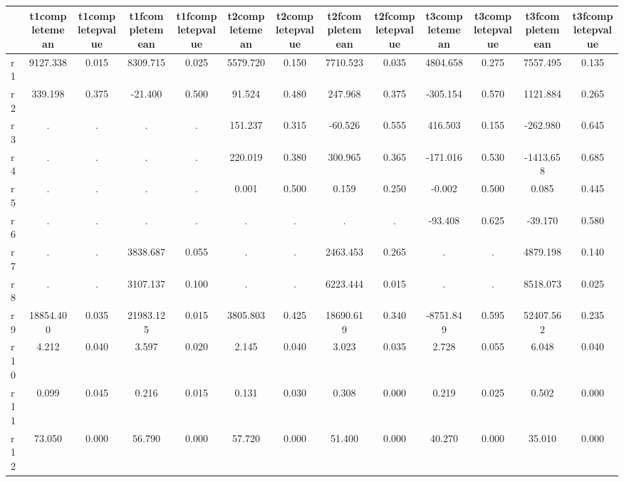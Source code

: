 \begin{table}[htbp]
\begin{tabular}{lcccccccccccc} \hline \hline
 & t1completemean  & t1completepvalue  & t1fcompletemean  & t1fcompletepvalue  & t2completemean  & t2completepvalue  & t2fcompletemean  & t2fcompletepvalue  & t3completemean  & t3completepvalue  & t3fcompletemean  & t3fcompletepvalue  \\  \hline 
r1 &  9127.338 &     0.015 &  8309.715 &     0.025 &  5579.720 &     0.150 &  7710.523 &     0.035 &  4804.658 &     0.275 &  7557.495 &     0.135 \\  
r2 &   339.198 &     0.375 &   -21.400 &     0.500 &    91.524 &     0.480 &   247.968 &     0.375 &  -305.154 &     0.570 &  1121.884 &     0.265 \\  
r3 &         . &         . &         . &         . &   151.237 &     0.315 &   -60.526 &     0.555 &   416.503 &     0.155 &  -262.980 &     0.645 \\  
r4 &         . &         . &         . &         . &   220.019 &     0.380 &   300.965 &     0.365 &  -171.016 &     0.530 & -1413.658 &     0.685 \\  
r5 &         . &         . &         . &         . &     0.001 &     0.500 &     0.159 &     0.250 &    -0.002 &     0.500 &     0.085 &     0.445 \\  
r6 &         . &         . &         . &         . &         . &         . &         . &         . &   -93.408 &     0.625 &   -39.170 &     0.580 \\  
r7 &         . &         . &  3838.687 &     0.055 &         . &         . &  2463.453 &     0.265 &         . &         . &  4879.198 &     0.140 \\  
r8 &         . &         . &  3107.137 &     0.100 &         . &         . &  6223.444 &     0.015 &         . &         . &  8518.073 &     0.025 \\  
r9 & 18854.400 &     0.035 & 21983.125 &     0.015 &  3805.803 &     0.425 & 18690.619 &     0.340 & -8751.849 &     0.595 & 52407.562 &     0.235 \\  
r10 &     4.212 &     0.040 &     3.597 &     0.020 &     2.145 &     0.040 &     3.023 &     0.035 &     2.728 &     0.055 &     6.048 &     0.040 \\  
r11 &     0.099 &     0.045 &     0.216 &     0.015 &     0.131 &     0.030 &     0.308 &     0.000 &     0.219 &     0.025 &     0.502 &     0.000 \\  
r12 &    73.050 &     0.000 &    56.790 &     0.000 &    57.720 &     0.000 &    51.400 &     0.000 &    40.270 &     0.000 &    35.010 &     0.000 \\  
\hline \hline \end{tabular}
\end{table}
